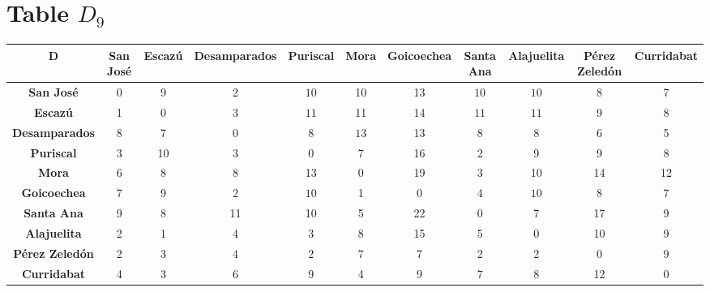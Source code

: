 \documentclass{article}
\begin{document}
\section{Table $D_{9}$}
\begin{center}
    \begin{tabular}{|c||c|c|c|c|c|c|c|c|c|c|}
        \hline
        \textbf{D} & \textbf{San José} & \textbf{Escazú} & \textbf{Desamparados} & \textbf{Puriscal} & \textbf{Mora} & \textbf{Goicoechea} & \textbf{Santa Ana} & \textbf{Alajuelita} & \textbf{Pérez Zeledón} & \textbf{Curridabat} \\
        \hline
        \hline
        \textbf{San José}& 0 & 9 & 2 & \cellcolor[HTML]{D74894}$10$ & 10 & 13 & \cellcolor[HTML]{D74894}$10$ & \cellcolor[HTML]{D74894}$10$ & 8 & 7 \\
        \hline
        \textbf{Escazú}& 1 & 0 & 3 & \cellcolor[HTML]{D74894}$11$ & 11 & 14 & \cellcolor[HTML]{D74894}$11$ & \cellcolor[HTML]{D74894}$11$ & 9 & 8 \\
        \hline
        \textbf{Desamparados}& 8 & 7 & 0 & \cellcolor[HTML]{D74894}$8$ & \cellcolor[HTML]{D74894}$13$ & 13 & \cellcolor[HTML]{D74894}$8$ & \cellcolor[HTML]{D74894}$8$ & 6 & 5 \\
        \hline
        \textbf{Puriscal}& 3 & 10 & 3 & 0 & 7 & 16 & 2 & 9 & 9 & 8 \\
        \hline
        \textbf{Mora}& 6 & 8 & 8 & 13 & 0 & 19 & 3 & 10 & 14 & 12 \\
        \hline
        \textbf{Goicoechea}& 7 & 9 & 2 & \cellcolor[HTML]{D74894}$10$ & 1 & 0 & 4 & \cellcolor[HTML]{D74894}$10$ & 8 & 7 \\
        \hline
        \textbf{Santa Ana}& 9 & 8 & 11 & 10 & 5 & 22 & 0 & 7 & 17 & 9 \\
        \hline
        \textbf{Alajuelita}& 2 & 1 & 4 & 3 & 8 & 15 & 5 & 0 & 10 & 9 \\
        \hline
        \textbf{Pérez Zeledón}& 2 & 3 & 4 & 2 & 7 & 7 & 2 & 2 & 0 & 9 \\
        \hline
        \textbf{Curridabat}& 4 & 3 & 6 & 9 & 4 & 9 & 7 & 8 & 12 & 0 \\
        \hline
    \end{tabular}
\end{center}
\end{document}
